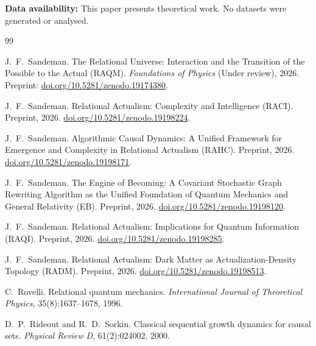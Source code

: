 \documentclass[11pt,a4paper]{article}
\theoremstyle{plain}
\theoremstyle{definition}
\theoremstyle{remark}
\begin{document}
\textbf{Data availability:} This paper presents theoretical work. No datasets
were generated or analysed.


\begin{thebibliography}{99}

J.~F.~Sandeman.
\newblock The Relational Universe: Interaction and the Transition of the
  Possible to the Actual ({RAQM}).
\newblock \textit{Foundations of Physics} (Under review), 2026.
\newblock Preprint: \href{https://doi.org/10.5281/zenodo.19174380}{doi.org/10.5281/zenodo.19174380}.

J.~F.~Sandeman.
\newblock Relational Actualism: Complexity and Intelligence ({RACI}).
\newblock Preprint, 2026.
\newblock \href{https://doi.org/10.5281/zenodo.19198224}{doi.org/10.5281/zenodo.19198224}.

J.~F.~Sandeman.
\newblock Algorithmic Causal Dynamics: A Unified Framework for Emergence and
  Complexity in Relational Actualism ({RAHC}).
\newblock Preprint, 2026.
\newblock \href{https://doi.org/10.5281/zenodo.19198171}{doi.org/10.5281/zenodo.19198171}.

J.~F.~Sandeman.
\newblock The Engine of Becoming: A Covariant Stochastic Graph Rewriting
  Algorithm as the Unified Foundation of Quantum Mechanics and General
  Relativity ({EB}).
\newblock Preprint, 2026.
\newblock \href{https://doi.org/10.5281/zenodo.19198120}{doi.org/10.5281/zenodo.19198120}.

J.~F.~Sandeman.
\newblock Relational Actualism: Implications for Quantum Information ({RAQI}).
\newblock Preprint, 2026.
\newblock \href{https://doi.org/10.5281/zenodo.19198285}{doi.org/10.5281/zenodo.19198285}.

J.~F.~Sandeman.
\newblock Relational Actualism: Dark Matter as Actualization-Density Topology
  ({RADM}).
\newblock Preprint, 2026.
\newblock \href{https://doi.org/10.5281/zenodo.19198513}{doi.org/10.5281/zenodo.19198513}.

C.~Rovelli.
\newblock Relational quantum mechanics.
\newblock \textit{International Journal of Theoretical Physics},
  35(8):1637--1678, 1996.

D.~P.~Rideout and R.~D.~Sorkin.
\newblock Classical sequential growth dynamics for causal sets.
\newblock \textit{Physical Review D}, 61(2):024002, 2000.


\end{thebibliography}
\end{document}
